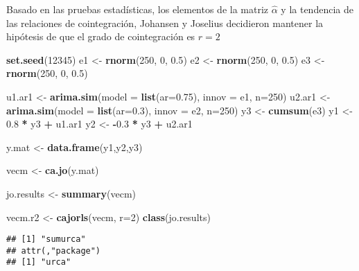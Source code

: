 \documentclass[]{book}
\newenvironment{Shaded}{\begin{snugshade}}{\end{snugshade}}
\newcommand{\KeywordTok}[1]{\textcolor[rgb]{0.13,0.29,0.53}{\textbf{#1}}}
\newcommand{\DataTypeTok}[1]{\textcolor[rgb]{0.13,0.29,0.53}{#1}}
\newcommand{\DecValTok}[1]{\textcolor[rgb]{0.00,0.00,0.81}{#1}}
\newcommand{\FloatTok}[1]{\textcolor[rgb]{0.00,0.00,0.81}{#1}}
\newcommand{\StringTok}[1]{\textcolor[rgb]{0.31,0.60,0.02}{#1}}
\newcommand{\OperatorTok}[1]{\textcolor[rgb]{0.81,0.36,0.00}{\textbf{#1}}}
\newcommand{\NormalTok}[1]{#1}
\theoremstyle{definition}
\theoremstyle{definition}
\theoremstyle{definition}
\theoremstyle{remark}
\begin{document}
Basado en las pruebas estadísticas, los elementos de la matriz
\(\hat{\alpha}\) y la tendencia de las relaciones de cointegración,
Johansen y Joselius decidieron mantener la hipótesis de que el grado de
cointegración es \(r=2\)

\begin{Shaded}
\begin{Highlighting}[]
\KeywordTok{set.seed}\NormalTok{(}\DecValTok{12345}\NormalTok{)}
\NormalTok{e1 <-}\StringTok{ }\KeywordTok{rnorm}\NormalTok{(}\DecValTok{250}\NormalTok{, }\DecValTok{0}\NormalTok{, }\FloatTok{0.5}\NormalTok{)}
\NormalTok{e2 <-}\StringTok{ }\KeywordTok{rnorm}\NormalTok{(}\DecValTok{250}\NormalTok{, }\DecValTok{0}\NormalTok{, }\FloatTok{0.5}\NormalTok{)}
\NormalTok{e3 <-}\StringTok{ }\KeywordTok{rnorm}\NormalTok{(}\DecValTok{250}\NormalTok{, }\DecValTok{0}\NormalTok{, }\FloatTok{0.5}\NormalTok{)}

\NormalTok{u1.ar1 <-}\StringTok{ }\KeywordTok{arima.sim}\NormalTok{(}\DataTypeTok{model =} \KeywordTok{list}\NormalTok{(}\DataTypeTok{ar=}\FloatTok{0.75}\NormalTok{),}
                    \DataTypeTok{innov =}\NormalTok{ e1, }\DataTypeTok{n=}\DecValTok{250}\NormalTok{)}
\NormalTok{u2.ar1 <-}\StringTok{ }\KeywordTok{arima.sim}\NormalTok{(}\DataTypeTok{model =} \KeywordTok{list}\NormalTok{(}\DataTypeTok{ar=}\FloatTok{0.3}\NormalTok{),}
                    \DataTypeTok{innov =}\NormalTok{ e2, }\DataTypeTok{n=}\DecValTok{250}\NormalTok{)}
\NormalTok{y3 <-}\StringTok{ }\KeywordTok{cumsum}\NormalTok{(e3)}
\NormalTok{y1 <-}\StringTok{ }\FloatTok{0.8} \OperatorTok{*}\StringTok{ }\NormalTok{y3 }\OperatorTok{+}\StringTok{ }\NormalTok{u1.ar1}
\NormalTok{y2 <-}\StringTok{ }\OperatorTok{-}\FloatTok{0.3} \OperatorTok{*}\StringTok{ }\NormalTok{y3 }\OperatorTok{+}\StringTok{ }\NormalTok{u2.ar1}

\NormalTok{y.mat <-}\StringTok{ }\KeywordTok{data.frame}\NormalTok{(y1,y2,y3)}

\NormalTok{vecm <-}\StringTok{ }\KeywordTok{ca.jo}\NormalTok{(y.mat)}

\NormalTok{jo.results <-}\StringTok{ }\KeywordTok{summary}\NormalTok{(vecm)}

\NormalTok{vecm.r2 <-}\StringTok{ }\KeywordTok{cajorls}\NormalTok{(vecm, }\DataTypeTok{r=}\DecValTok{2}\NormalTok{)}
\KeywordTok{class}\NormalTok{(jo.results)}
\end{Highlighting}
\end{Shaded}

\begin{verbatim}
## [1] "sumurca"
## attr(,"package")
## [1] "urca"
\end{verbatim}
\end{document}
